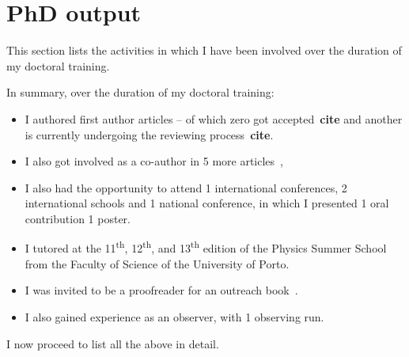 \chapter{PhD output} \label{app:phd_output}

This section lists the activities in which I have been involved over the duration of my doctoral training.

In summary, over the duration of my doctoral training:
\begin{itemize}
    \item I authored {} first author articles -- of which {\red zero} got accepted~\textbf{cite} and another is currently undergoing the reviewing process~\textbf{cite}. 
    \item I also got involved as a co-author in 5 more articles~\citep{figueira_radial_2016, barros_precise_2017, santerne_earthsized_2018, lillo-box_troy_2018, ulmer-moll_telluric_2018},
    \item I also had the opportunity to attend 1 international conferences, 2 international schools and 1 national conference, in which I presented 1 oral contribution 1 poster.
    \item I tutored at the 11\textsuperscript{th}, 12\textsuperscript{th}, and 13\textsuperscript{th} edition of the Physics Summer School from the Faculty of Science of the University of Porto.
    \item I was invited to be a proofreader for an outreach book~\citet{figueira_astro_2015}.
    \item I also gained experience as an observer, with 1 observing run.
\end{itemize}

I now proceed to list all the above in detail.

\clearpage


\clearpage


\clearpage


\clearpage


\clearpage


\clearpage

